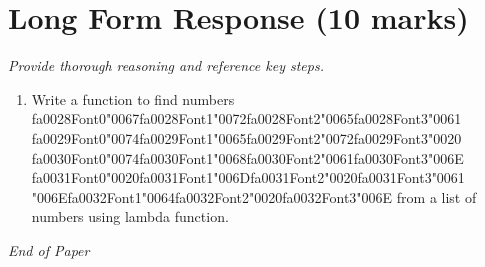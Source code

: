 \documentclass[12pt]{article}
\begin{document}
\section*{Long Form Response (10 marks)}
\textit{Provide thorough reasoning and reference key steps.}
\begin{enumerate}[label=\arabic*.]
\item Write a function to find numbers {\csname fa0028Font0\endcsname\char"0067}{\csname fa0028Font1\endcsname\char"0072}{\csname fa0028Font2\endcsname\char"0065}{\csname fa0028Font3\endcsname\char"0061} {\csname fa0029Font0\endcsname\char"0074}{\csname fa0029Font1\endcsname\char"0065}{\csname fa0029Font2\endcsname\char"0072}{\csname fa0029Font3\endcsname\char"0020} {\csname fa0030Font0\endcsname\char"0074}{\csname fa0030Font1\endcsname\char"0068}{\csname fa0030Font2\endcsname\char"0061}{\csname fa0030Font3\endcsname\char"006E} {\csname fa0031Font0\endcsname\char"0020}{\csname fa0031Font1\endcsname\char"006D}{\csname fa0031Font2\endcsname\char"0020}{\csname fa0031Font3\endcsname\char"0061} {\char"006E}{\csname fa0032Font1\endcsname\char"0064}{\csname fa0032Font2\endcsname\char"0020}{\csname fa0032Font3\endcsname\char"006E} from a list of numbers using lambda
function.
\end{enumerate}

\vfill
\noindent\textit{End of Paper}
\end{document}
